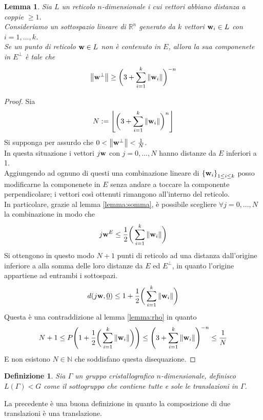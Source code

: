 \documentclass[a4paper,11pt,openright,twoside	]{book}
\newtheorem{definition}{Definizione}[section]
\newtheorem{lemma}[theorem]{Lemma}
\begin{document}
\begin{lemma}
\label{lemma:somma2}
Sia $L$ un reticolo $n$-dimensionale i cui vettori abbiano distanza a coppie $\geq 1$. \\ Consideriamo un sottospazio lineare di $\mathbb{R}^n$ generato da $k$ vettori $\vb{w}_i \in L$ con $i = 1,... ,k$. \\
Se un punto di reticolo $\vb{w} \in L$ non è contenuto in $E$, allora la sua componenete in $E^{\perp}$ è tale che 
\[ \norm{\vb{w}^{\perp}} \geq \bigg( 3 +  \sum_{i = 1}^{k} \norm{\vb{w}_i} \bigg)^{-n} \]
\end{lemma}

\begin{proof}
Sia \[ N := \left\lfloor
\bigg( 3 +  \sum_{i = 1}^{k} \norm{\vb{w}_i} \bigg)^{n}
\right\rfloor\]
Si supponga per assurdo che $0 < \norm{\vb{w}^{\perp}}  < \frac{1}{N}$. \\
In questa situazione i vettori $j \vb{w}$ con $j = 0, ..., N$ hanno distanze da $E$ inferiori a 1. \\
Aggiungendo ad ognuno di questi una combinazione lineare di ${\{\vb{w}_i\}}_{1 \leq i \leq k }$ posso modificarne la componenete in $E$ senza andare a toccare la componente perpendicolare; i vettori così ottenuti rimangono all'interno del reticolo. \\
In particolare, grazie al lemma \ref{lemma:somma}, è possibile scegliere $\forall j = 0, ..., N$ la combinazione in modo che \[ j \vb{w}^{E} \leq \frac{1}{2} \bigg( \sum_{i = 1}^{k} \norm{\vb{w}_i} \bigg)  \]  
Si ottengono in questo modo $N+1$ punti di reticolo ad una distanza dall'origine inferiore a alla somma delle loro distanze da $E$ ed $E^{\perp}$, in quanto l'origine appartiene ad entrambi i sottospazi.
\[ d(j\vb{w}, \underline{0} ) \leq 1 + \frac{1}{2} \bigg( \sum_{i = 1}^{k} \norm{\vb{w}_i} \bigg) \]
Questa è una contraddizione al lemma \ref{lemma:rho} in quanto 
\[ N+1 \leq P \Bigg( 1 + \frac{1}{2} \bigg( \sum_{i = 1}^{k} \norm{\vb{w}_i} \bigg) \Bigg)  \leq \Bigg( 3 +  \sum_{i = 1}^{k} \norm{\vb{w}_i} \Bigg)^{-n} \leq  \frac{1}{N} \]
E non esistono $N \in \mathbb{N}$ che soddisfano questa disequazione.
\end{proof}


\begin{definition}
Sia $\Gamma$ un gruppo cristallografico $n$-dimensionale, definisco $L(\Gamma)<G$ come il sottogruppo che contiene tutte e sole le translazioni in $\Gamma$.
\end{definition}

La precedente è una buona definizione in quanto la composizione di due translazioni è una translazione. 
\end{document}
